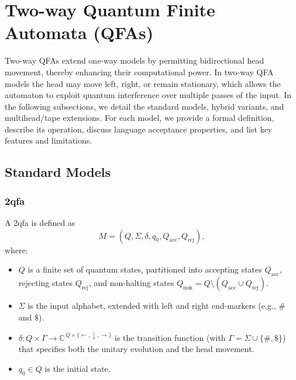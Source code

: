 \section{Two-way Quantum Finite Automata (QFAs)}
\label{sec:two-way-qfas}

Two-way QFAs extend one-way models by permitting bidirectional head movement, thereby enhancing their computational power. In two-way QFA models the head may move left, right, or remain stationary, which allows the automaton to exploit quantum interference over multiple passes of the input. In the following subsections, we detail the standard models, hybrid variants, and multihead/tape extensions. For each model, we provide a formal definition, describe its operation, discuss language acceptance properties, and list key features and limitations.

\subsection{Standard Models}
\label{subsec:two-way-standard}

\subsubsection{\acrfull{2qfa}}
\label{sssec:2qfa}
\begin{definition}
A \gls{2qfa} is defined as 
\[
M = (Q, \Sigma, \delta, q_0, Q_{\text{acc}}, Q_{\text{rej}}),
\]
where:
\begin{itemize}
    \item \( Q \) is a finite set of quantum states, partitioned into accepting states \( Q_{\text{acc}} \), rejecting states \( Q_{\text{rej}} \), and non-halting states \( Q_{\text{non}} = Q \setminus (Q_{\text{acc}} \cup Q_{\text{rej}}) \).
    \item \( \Sigma \) is the input alphabet, extended with left and right end-markers (e.g., \( \# \) and \( \$ \)).
    \item \( \delta: Q \times \Gamma \to \mathbb{C}^{\, Q \times \{ \leftarrow, \downarrow, \rightarrow \}} \) is the transition function (with \( \Gamma = \Sigma \cup \{ \#, \$ \} \)) that specifies both the unitary evolution and the head movement.
    \item \( q_0 \in Q \) is the initial state.
\end{itemize}
\end{definition}

